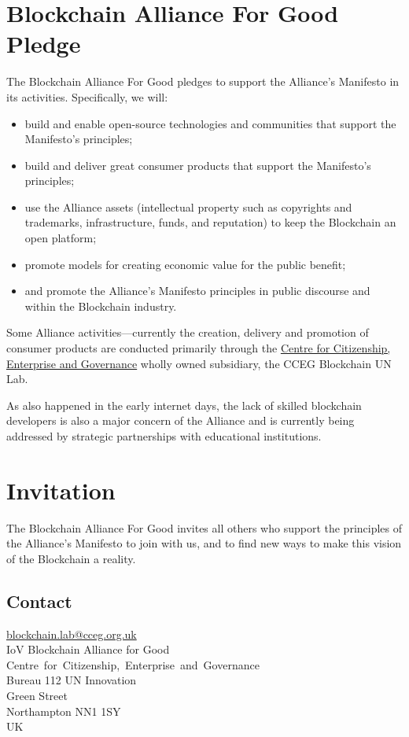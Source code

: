 \documentclass[twoside,twocolumn]{article}
\begin{document}
\section{Blockchain Alliance For Good Pledge}
The Blockchain Alliance For Good pledges to support the Alliance's Manifesto in
its activities. Specifically, we will:

\begin{itemize}
  \item build and enable open-source technologies and communities that support
  the Manifesto’s principles;
  \item build and deliver great consumer products that support the Manifesto’s
  principles;
  \item use the Alliance assets (intellectual property such as copyrights and
  trademarks, infrastructure, funds, and reputation) to keep the Blockchain an
  open platform;
  \item promote models for creating economic value for the public benefit;
  \item and promote the Alliance's Manifesto principles in public discourse and
  within the Blockchain industry.
\end{itemize}

Some Alliance activities—currently the creation, delivery and promotion of
consumer products are conducted primarily through the
\href{www.cceg.org.uk}{Centre for Citizenship, Enterprise and Governance} wholly
owned subsidiary, the CCEG Blockchain UN Lab.

As also happened in the early internet days, the lack of skilled
blockchain developers is also a major concern of the Alliance and is currently
being addressed by strategic partnerships with educational institutions.

\section{Invitation}

The Blockchain Alliance For Good invites all others who support the principles of the
Alliance's Manifesto to join with us, and to find new ways to make this vision
of the Blockchain a reality.

\subsection{Contact}

\href{mailto:blockchain.lab@cceg.org.uk}{blockchain.lab@cceg.org.uk}\\
IoV Blockchain Alliance for Good\\
\mbox{Centre for Citizenship, Enterprise and Governance}\\
Bureau 112 UN Innovation\\
Green Street\\
Northampton NN1 1SY\\
UK
\end{document}

